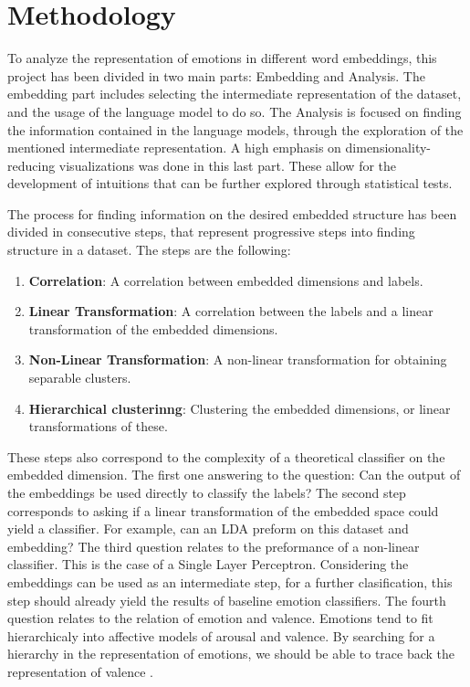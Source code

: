\chapter{Methodology}\label{chap:Methodology}

To analyze the representation of emotions in different word embeddings, this project has been divided in two main parts: Embedding and Analysis. The embedding part includes selecting the intermediate representation of the dataset, and the usage of the language model to do so. The Analysis is focused on finding the information contained in the language models, through the exploration of the mentioned intermediate representation. A high emphasis on dimensionality-reducing visualizations was done in this last part. These allow for the development of intuitions that can be further explored through statistical tests.

The process for finding information on the desired embedded structure has been divided in consecutive steps, that represent progressive steps into finding structure in a dataset. The steps are the following:

\begin{enumerate}
  \item \textbf{Correlation}: A correlation between embedded dimensions and labels.
  \item \textbf{Linear Transformation}: A correlation between the labels and a linear transformation of the embedded dimensions.
  \item \textbf{Non-Linear Transformation}: A non-linear transformation for obtaining separable clusters.
  \item \textbf{Hierarchical clusterinng}: Clustering the embedded dimensions, or linear transformations of these.
\end{enumerate}

These steps also correspond to the complexity of a theoretical classifier on the embedded dimension. The first one answering to the question: Can the output of the embeddings be used directly to classify the labels? The second step corresponds to asking if a linear transformation of the embedded space could yield a classifier. For example, can an LDA preform on this dataset and embedding? The third question relates to the preformance of a non-linear classifier. This is the case of a Single Layer Perceptron. Considering the embeddings can be used as an intermediate step, for a further clasification, this step should already yield the results of baseline emotion classifiers. The fourth question relates to the relation of emotion and valence. Emotions tend to fit hierarchicaly into affective models of arousal and valence. \cite{TODO} By searching for a hierarchy in the representation of emotions, we should be able to trace back the representation of valence \cite{TODO}.

